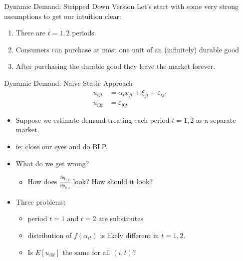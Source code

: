 \documentclass[aspectratio=169,11pt]{beamer}
\begin{document}
%




\begin{frame}{Dynamic Demand: Stripped Down Version}
Let's start with some very strong assumptions to get our intuition clear:
\begin{enumerate}
\item There are $t=1,2$ periods.
\item Consumers can purchase at most one unit of an (infinitely) durable good
\item After purchasing the durable good they leave the market forever.
\end{enumerate}
\end{frame}

\begin{frame}{Dynamic Demand: Naive Static Approach}
\begin{align*}
u_{ijt} &=   \alpha_i x_{jt}  +  \xi_{jt} + \varepsilon_{ijt}\\
u_{i0t} &=  \varepsilon_{i0t} 
\end{align*}
\begin{itemize}
\item Suppose  we estimate demand treating each period $t=1,2$ as a \alert{separate market}.
\item ie: close our eyes and do BLP.
\item What do we get wrong?
\begin{itemize}
\item How does $\frac{\partial q_{j,t}}{\partial p_{k,s}}$ look? How should it look?
\end{itemize}
\item Three problems: 
\begin{itemize}
\item period $t=1$ and $t=2$ are \alert{substitutes}
\item distribution of $f(\alpha_{it})$ is likely different in $t=1,2$.
\item Is $E[u_{i0t}]$ the same for all $(i,t)$?
\end{itemize}
\end{itemize}
\end{frame}
\end{document}
